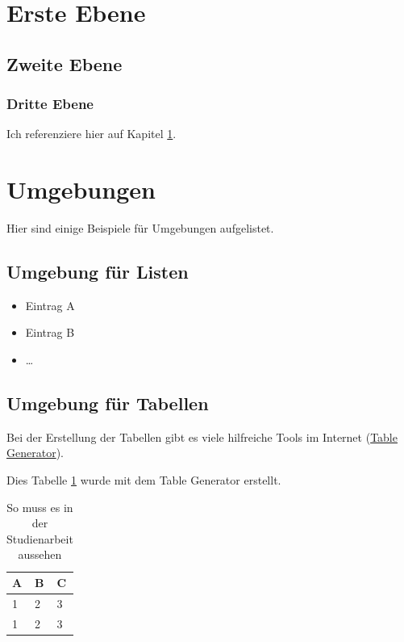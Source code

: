 \section{Erste Ebene}\label{sec:ebene}
\blindtext
\subsection{Zweite Ebene}\label{sec:subebene}
\blindtext[1]
\subsubsection{Dritte Ebene}\label{sec:subsubebene}
Ich referenziere hier auf Kapitel \ref{sec:ebene}.
\blindtext[2]

\clearpage

\section{Umgebungen}\label{sec:umgebungen}
Hier sind einige Beispiele für Umgebungen aufgelistet.

\subsection{Umgebung für Listen}
\begin{itemize}
    \item Eintrag A
    \item Eintrag B
    \item \dots
\end{itemize}

\subsection{Umgebung für Tabellen}
Bei der Erstellung der Tabellen gibt es viele hilfreiche Tools im Internet
(\href{https://www.tablesgenerator.com/}{Table Generator}).

Dies Tabelle \ref{table:simple} wurde mit dem Table Generator erstellt.
\begin{table}[h!]
    \centering
    \caption{So muss es in der Studienarbeit aussehen}
    \label{table:simple}
    \begin{tabular}[t]{|l|l|l|}
        \rowcolor[HTML]{CBCEFB}
        \hline 
        A & B & C \\ \hline
        1 & 2 & 3 \\
        1 & 2 & 3 \\ \hline
    \end{tabular}
\end{table}


